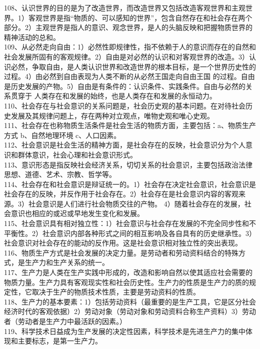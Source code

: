 \documentclass[a4paper,fleqn]{article}
\begin{document}
108、认识世界的目的是为了改造世界，而改造世界又包括改造客观世界和主观世界。1）客观世界是指“物质的、可以感知的世界”，包含自然存在和社会存在两个部分。2）主观世界是指人的意识、观念世界，是人的头脑反映和把握物质世界的精神活动的总和。 \\
109、从必然走向自由：1）必然性即规律性，指不依赖于人的意识而存在的自然和社会发展所固有的客观规律。2）自由是对必然的认识和对客观世界的改造。3）认识必然，争取自由，是人类认识世界和改造世界的根本目标，是一个世界历史性的过程。4）由必然到自由表现为人类不断的从必然王国走向自由王国 的过程。自由是历史发展的产物。5）自由是有条件的：认识条件、实践条件。自由与必然的关系贯穿于 人类存在和发展的始终，也是人类存在和发展的永恒动力。 \\
110、社会存在与社会意识的关系问题是，社会历史观的基本问题。在对待社会历史发展及其规律问题上，存在两种对立观点，唯物史观和唯心史观。 \\
111、社会存在也称物质生活条件是社会生活的物质方面，主要包括：a、物质生产方式 b、自然地理环境 c、人口因素。 \\
112、社会意识是社会生活的精神方面，是社会存在的反映，社会意识分为个人意识和群体意识，社会心理和社会意识形式。 \\
113、意识形态是指反映社会经济关系，切切关系的社会意识，主要包括政治法律思想、道德、艺术、宗教、哲学等。 \\
114、社会存在和社会意识是辩证统一的。1）社会存在决定社会意识，社会意识是社会存在的反映，并反作用于社会存在。2）社会存在是社会意识内容的客观来源。3）社会意识是人们进行社会物质交往的产物。 4）随着社会存在的发展，社会意识也相应的或迟或早地发生变化和发展。 \\
115、社会意识具有相对独立性：1）社会意识与社会存在发展的不完全同步性和不平衡性。2）社会意识内部各种形式之间的相互影响及各自具有的历史继承性。3）社会意识对社会存在的能动的反作用。这是社会意识相对独立性的突出表现。 \\
116、物质生产方式是社会发展的决定力量。是劳动者和劳动资料结合的特殊方式，是生产力和生产关系的统一。 \\
117、生产力是人类在生产实践中形成的，改造和影响自然以使其适应社会需要的物质力量。生产力具有客观现实性和社会历史性。生产力的性质是生产力的质的规定性，它取决于生产的物质技术性质，主要是劳动资料的性质。 \\
118、生产力的基本要素：1）包括劳动资料（最重要的是生产工具，它是区分社会经济时代的客观依据）2）劳动对象（劳动对象和劳动资料合称生产资料）3）劳动者（劳动者是生产力中最活跃的因素。） \\
119、科学技术日益成为生产发展的决定性因素，科学技术是先进生产力的集中体现和主要标志，是第一生产力。 \\
\end{document}
